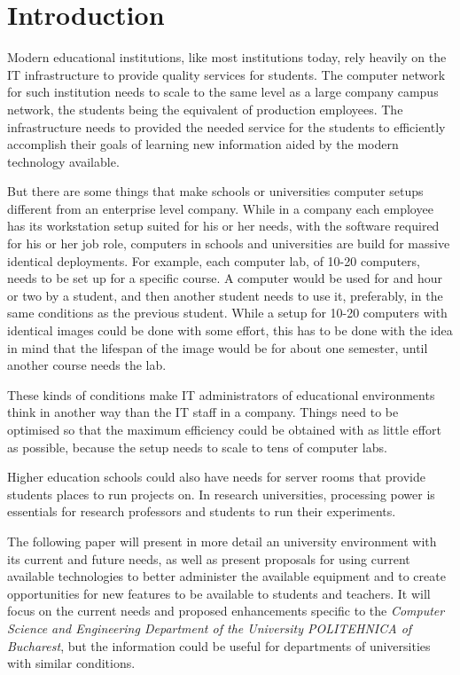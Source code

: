 
\chapter{Introduction}\label{ch:intro} \bigskip


Modern educational institutions, like most institutions today, rely
heavily on the IT infrastructure to provide quality services for
students. The computer network for such institution needs to scale to
the same level as a large company campus network, the students being the
equivalent of production employees. The infrastructure needs to provided
the needed service for the students to efficiently accomplish their
goals of learning new information aided by the modern technology
available.


But there are some things that make schools or universities computer
setups different from an enterprise level company. While in a company
each employee has its workstation setup suited for his or her needs,
with the software required for his or her job role, computers in schools
and universities are build for massive identical deployments. For
example, each computer lab, of 10-20 computers, needs to be set up for a
specific course. A computer would be used for and hour or two by a
student, and then another student needs to use it, preferably, in the
same conditions as the previous student. While a setup for 10-20
computers with identical images could be done with some effort, this has
to be done with the idea in mind that the lifespan of the image would be
for about one semester, until another course needs the lab.

These kinds of conditions make IT administrators of educational
environments think in another way than the IT staff in a company. Things
need to be optimised so that the maximum efficiency could be obtained
with as little effort as possible, because the setup needs to scale to
tens of computer labs.

Higher education schools could also have needs for server rooms that
provide students places to run projects on. In research universities,
processing power is essentials for research professors and students to
run their experiments.


The following paper will present in more detail an university
environment with its current and future needs, as well as present
proposals for using current available technologies to better administer
the available equipment and to create opportunities for new features to
be available to students and teachers. It will focus on the current
needs and proposed enhancements specific to the \emph{Computer Science
and Engineering Department of the University POLITEHNICA of Bucharest},
but the information could be useful for departments of universities with
similar conditions.

